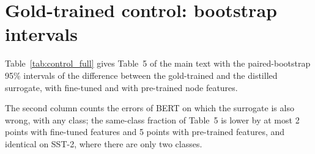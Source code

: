 \documentclass[3p,times,10pt,nopreprintline]{elsarticle}
\begin{document}
\section{Gold-trained control: bootstrap intervals}

Table~\ref{tab:control_full} gives Table~5 of the main text with the paired-bootstrap 95\% intervals of the difference between the gold-trained and the distilled surrogate, with fine-tuned and with pre-trained node features.

The second column counts the errors of BERT on which the surrogate is also wrong, with any class; the same-class fraction of Table~5 is lower by at most 2 points with fine-tuned features and 5 points with pre-trained features, and identical on SST-2, where there are only two classes.

\begin{table}[H]
\centering
\scriptsize
\setlength{\tabcolsep}{4pt}
\caption{Gold-trained control with intervals, with fine-tuned (upper block) and pre-trained (lower block) node features: accuracy with respect to the gold labels, fraction of BERT's errors on which the surrogate is also wrong (any class), and fraction on which it gives BERT's wrong class with confidence above 0.9. \(\Delta\): gold-trained minus distilled surrogate, with a paired-bootstrap 95\% interval.}
\label{tab:control_full}
\end{table}
\end{document}
